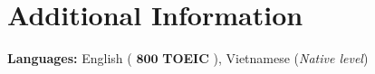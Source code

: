 \section{\textbf{Additional Information}}
\vspace{-0.4mm}
\vspace{0.5mm}
\textbf{Languages:} English (
    $\textbf{800}$ \textbf{TOEIC}
), Vietnamese (\textit{Native level}) \\
\vspace{-6mm}